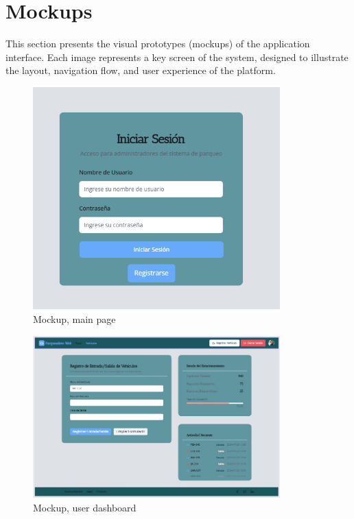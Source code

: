 \section{Mockups}

This section presents the visual prototypes (mockups) of the application interface.
Each image represents a key screen of the system, designed to illustrate the layout,
navigation flow, and user experience of the platform.

\begin{figure}[h!]
    \centering
    \includegraphics[width=0.85\textwidth]{Mockups/mkup-2.png}
    \caption{Mockup, main page}
    \label{fig:mkup-1}
\end{figure}

\begin{figure}[h!]
    \centering
    \includegraphics[width=0.85\textwidth]{Mockups/mkup-1.jpeg}
    \caption{Mockup, user dashboard}
    \label{fig:mkup-2}
\end{figure}

